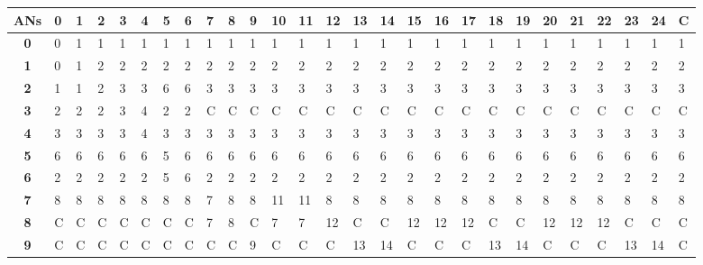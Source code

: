 \begin{table}[ht]\tiny
 \begin{center}
  \begin{tabular}{|c|p{0.1cm}|p{0.1cm}|p{0.1cm}|p{0.1cm}|p{0.1cm}|p{0.1cm}|p{0.1cm}|p{0.1cm}|p{0.1cm}|p{0.1cm}|p{0.1cm}|p{0.1cm}|p{0.1cm}|p{0.1cm}|p{0.1cm}|p{0.1cm}|p{0.1cm}|p{0.1cm}|p{0.1cm}|p{0.1cm}|p{0.1cm}|p{0.1cm}|p{0.1cm}|p{0.1cm}|p{0.1cm}|p{0.1cm}|}
   \hline
    \textbf{\acp{AN}} & \textbf{0} & \textbf{1} & \textbf{2} & \textbf{3} & \textbf{4} & \textbf{5} & \textbf{6} & \textbf{7} & \textbf{8} & 
    \textbf{9} & \textbf{10} & \textbf{11} & \textbf{12} & \textbf{13} & \textbf{14} & \textbf{15} & \textbf{16} & \textbf{17} & \textbf{18} & 
    \textbf{19} & \textbf{20} & \textbf{21} & \textbf{22} & \textbf{23} & \textbf{24} & \textbf{C} \\
   \hline
   \textbf{0} & 0 & 1 & 1 & 1 & 1 & 1 & 1 & 1 & 1 & 1 & 1 & 1 & 1 & 1 & 1 & 1 & 1 & 1 & 1 & 1 & 1 & 1 & 1 & 1 & 1 & 1 \\
   \hline
   \textbf{1} & 0 & 1 & 2 & 2 & 2 & 2 & 2 & 2 & 2 & 2 & 2 & 2 & 2 & 2 & 2 & 2 & 2 & 2 & 2 & 2 & 2 & 2 & 2 & 2 & 2 & 2 \\
   \hline
   \textbf{2} & 1 & 1 & 2 & 3 & 3 & 6 & 6 & 3 & 3 & 3 & 3 & 3 & 3 & 3 & 3 & 3 & 3 & 3 & 3 & 3 & 3 & 3 & 3 & 3 & 3 & 3 \\
   \hline
   \textbf{3} & 2 & 2 & 2 & 3 & 4 & 2 & 2 & C & C & C & C & C & C & C & C & C & C & C & C & C & C & C & C & C & C & C \\
   \hline
   \textbf{4} & 3 & 3 & 3 & 3 & 4 & 3 & 3 & 3 & 3 & 3 & 3 & 3 & 3 & 3 & 3 & 3 & 3 & 3 & 3 & 3 & 3 & 3 & 3 & 3 & 3 & 3 \\
   \hline
   \textbf{5} & 6 & 6 & 6 & 6 & 6 & 5 & 6 & 6 & 6 & 6 & 6 & 6 & 6 & 6 & 6 & 6 & 6 & 6 & 6 & 6 & 6 & 6 & 6 & 6 & 6 & 6 \\
   \hline
   \textbf{6} & 2 & 2 & 2 & 2 & 2 & 5 & 6 & 2 & 2 & 2 & 2 & 2 & 2 & 2 & 2 & 2 & 2 & 2 & 2 & 2 & 2 & 2 & 2 & 2 & 2 & 2 \\
   \hline
   \textbf{7} & 8 & 8 & 8 & 8 & 8 & 8 & 8 & 7 & 8 & 8 & 11 & 11 & 8 & 8 & 8 & 8 & 8 & 8 & 8 & 8 & 8 & 8 & 8 & 8 & 8 & 8 \\
   \hline
   \textbf{8} & C & C & C & C & C & C & C & 7 & 8 & C & 7 & 7 & 12 & C & C & 12 & 12 & 12 & C & C & 12 & 12 & 12 & C & C & C \\
   \hline
   \textbf{9} & C & C & C & C & C & C & C & C & C & 9 & C & C & C & 13 & 14 & C & C & C & 13 & 14 & C & C & C & 13 & 14 & C \\

\end{tabular}
\end{center}
\end{table}
